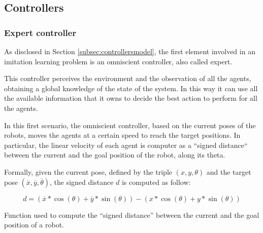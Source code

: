 
\subsection{Controllers}
\label{subsec:task1controllers}

\subsubsection{Expert controller}
\label{subsubsec:omniscient}

As disclosed in Section \ref{subsec:controllersmodel}, the first element involved in 
an imitation learning problem is an omniscient controller, also called expert.

This controller perceives the environment and the observation of all the agents, 
obtaining a global knowledge of the state of the system. In this way it can use all 
the available information that it owns to decide the best action to perform for all 
the agents. 

In this first scenario, the omniscient controller, based on the current poses of the 
robots, moves the agents at a certain speed to reach the target positions. In 
particular, the linear velocity of each agent is computer as a ``signed distance`` 
between the current and the goal position of the robot, along its theta. 

Formally, given the current pose, defined by the triple $(x, y, \theta)$ and the 
target pose $(\overline x, \overline y, \overline \theta)$, the signed distance $d$ 
is computed as follow:
\begin{Equation}[!htb]
	\centering
	\begin{equation}
	d = \left(\overline x * \cos (\theta) + \overline y * \sin (\theta)\right) -
	\left( x * \cos (\theta) + y * \sin (\theta)\right)
	\end{equation}
	\caption[Signed distance function.]{Function used to compute the ``signed 
	distance'' between the current and the goal position of a robot.}
	\label{eq:signeddist}
\end{Equation}

